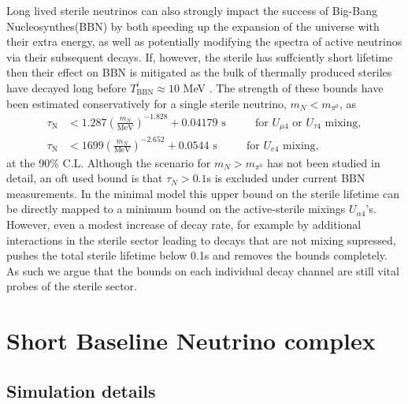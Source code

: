\documentclass[11pt, a4paper]{article}
\begin{document}
Long lived sterile neutrinos can also strongly impact the success of Big-Bang Nucleosynthes(BBN) by both speeding up the expansion of the universe with their extra energy, as well as potentially modifying the spectra of active neutrinos via their subsequent decays. If, however, the sterile has suffciently short lifetime  then their effect on BBN is mitigated as the bulk of thermally produced steriles have decayed long before $T^i_\text{BBN} \approx 10$ MeV \cite{Fields:2006ga}. The strength of these bounds have been estimated conservatively for a single sterile neutrino, $m_N < m_{\pi^0}$, as \cite{Dolgov:2000jw,Dolgov:2000pj}
\begin{align*}
	\tau_\text{N} &< 1.287 \left( \frac{m_N}{\text{MeV}}\right)^{-1.828}+0.04179 \text{  s    $\qquad$  for $U_{\mu 4}$ or $U_{\tau 4}$ mixing},\\
	\tau_\text{N} &< 1699 \left( \frac{m_N}{\text{MeV}}\right)^{-2.652}+0.0544 \text{  s    $\qquad$  for $U_{e 4}$ mixing},
\end{align*}
at the 90\% C.L. Although the scenario for $m_N > m_{\pi^0}$ has not been studied in detail, an oft used bound is that $\tau_N > 0.1$s is excluded under current BBN measurements. In the minimal model this upper bound on the sterile lifetime can be directly mapped to a minimum bound on the active-sterile mixings $U_{\alpha 4}$'s. However, even a modest increase of decay rate, for example by additional interactions in the sterile sector leading to decays that are not mixing supressed, pushes the total sterile lifetime below 0.1s and removes the bounds completely. As such we argue that the bounds on each individual decay channel are still vital probes of the sterile sector. \\

\section{\label{sec:simulation}Short Baseline Neutrino complex}

\subsection{Simulation details}
\end{document}
